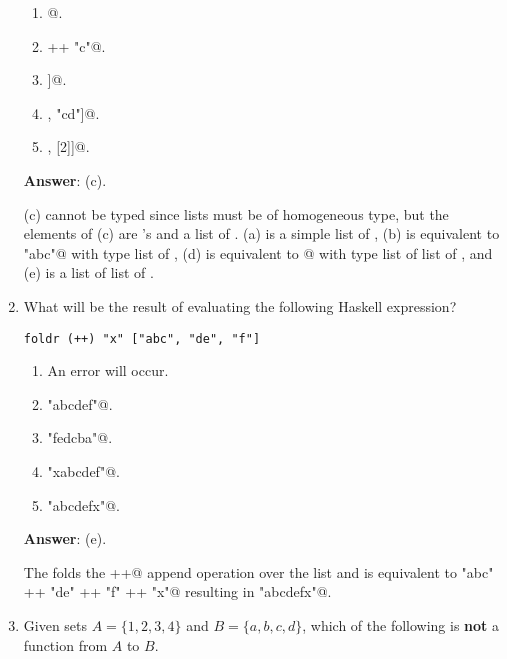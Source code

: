 \documentclass[12pt]{article}
\begin{document}
\begin{enumerate}
\begin{enumerate}

\item \verb@[1, 2, 3]@.

\item \verb@['a', 'b'] ++ "c"@.

\item \verb@[1, 2, [1]]@.

\item \verb@[['a', 'b'], "cd"]@.

\item \verb@[[1], [2]]@.

\end{enumerate}

\textbf{Answer}: (c).

(c) cannot be typed since lists must be of homogeneous type, but the
elements of (c) are \verb@NUM@'s and a list of \verb@NUM@.  (a) is a
simple list of \verb@Num@, (b) is equivalent to \verb@"abc"@ with type
list of \verb@Char@, (d) is equivalent to \verb@["ab", "cd"]@ with
type list of list of \verb@Char@, and (e) is a list of list of
\verb@Num@.

\item What will be the result of evaluating the following Haskell expression?

\begin{verbatim}
foldr (++) "x" ["abc", "de", "f"] 
\end{verbatim}

\begin{enumerate}

\item An error will occur.

\item \verb@"abcdef"@.

\item \verb@"fedcba"@.  
  
\item \verb@"xabcdef"@.

\item \verb@"abcdefx"@.

\end{enumerate}

\textbf{Answer}: (e).

The \verb@foldr@ folds the \verb@++@ append operation over the list
and is equivalent to \verb@"abc" ++ "de" ++ "f" ++ "x"@ resulting in 
\verb@"abcdefx"@.

\item Given sets $A = \{1, 2, 3, 4\}$ and $B = \{a, b, c, d\}$, which of
  the following is \textbf{not} a function from $A$ to $B$.


\end{enumerate}
\end{document}
